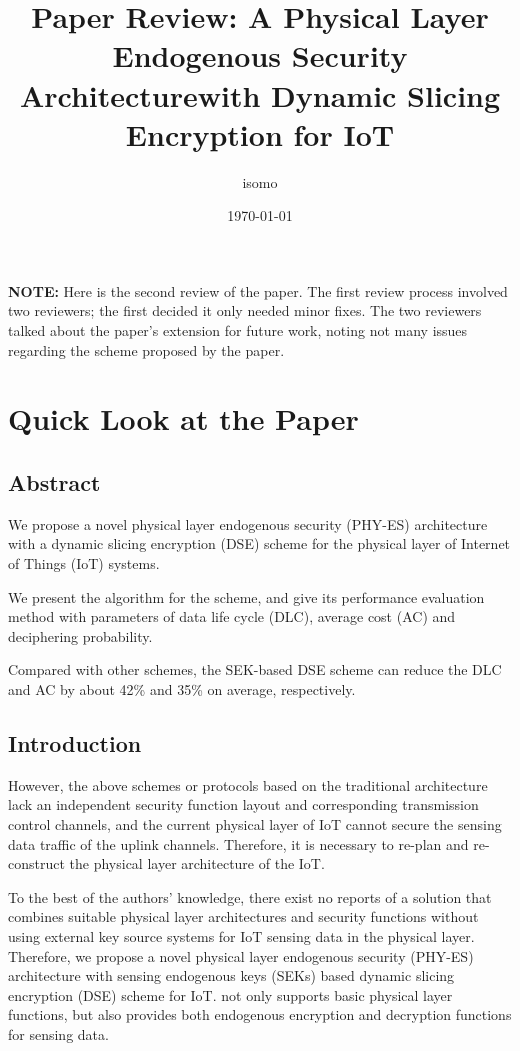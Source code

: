 \documentclass[a4paper]{article}
\title{Paper Review: A Physical Layer Endogenous Security Architecturewith Dynamic Slicing Encryption for IoT}
\author{isomo}
\date{\today}
\begin{document}
\maketitle

\textbf{NOTE:} Here is the second review of the paper. The first review process involved two reviewers; the first decided it only needed minor fixes. The two reviewers talked about the paper's extension for future work, noting not many issues regarding the scheme proposed by the paper.

\section{Quick Look at the Paper}
\subsection{Abstract}

We propose a novel physical layer endogenous security (PHY-ES) architecture with a dynamic slicing encryption (DSE) scheme for the physical layer of Internet of Things (IoT) systems.

We present the algorithm for the scheme, and give its performance evaluation method with parameters of data life cycle (DLC), average cost (AC) and deciphering probability.

Compared with other schemes, the SEK-based DSE scheme can reduce the DLC and AC by about 42\% and 35\% on average, respectively.

\subsection{Introduction}

However, the above schemes or protocols based on the traditional architecture lack an independent security function layout and corresponding transmission control channels, and the current physical layer of IoT cannot secure the sensing data traffic of the uplink channels. Therefore, it is necessary to re-plan and re-construct the physical layer architecture of the IoT.

To the best of the authors' knowledge, there exist no reports of a solution that combines suitable physical layer architectures and security functions without using external key source systems for IoT sensing data in the physical layer. Therefore, we propose a novel physical layer endogenous security (PHY-ES) architecture with sensing endogenous keys (SEKs) based dynamic slicing encryption (DSE) scheme for IoT. not only supports basic physical layer functions, but also provides both endogenous encryption and decryption functions for sensing data.
\end{document}
